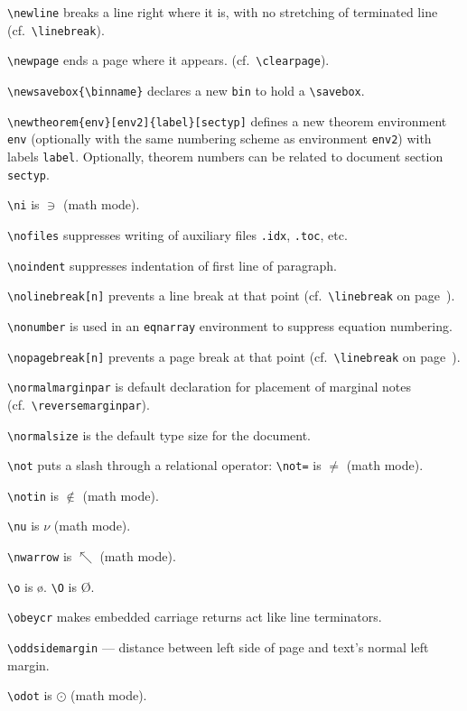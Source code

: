 \verb"\newline" breaks a line right where it is, with no stretching of
	terminated line (cf.\ \verb"\linebreak").

\verb"\newpage" ends a page where it appears. (cf.\ \verb"\clearpage").

\verb"\newsavebox{\binname}" declares a new \verb"bin" to hold a
	\verb"\savebox".

\verb"\newtheorem{env}[env2]{label}[sectyp]" defines a new theorem environment
	\verb"env" (optionally with the same numbering scheme as environment
	\verb"env2") with labels \verb"label".  Optionally, theorem numbers
	can be related to document section \verb"sectyp".

\verb"\ni" is $\ni$ (math mode).

\verb"\nofiles" suppresses writing of auxiliary files \verb".idx",
	\verb".toc", etc.

\verb"\noindent" suppresses indentation of first line of paragraph.

\verb"\nolinebreak[n]" prevents a line break at that point
	(cf.\ \verb"\linebreak" on page~\pageref{break-ref}).

\verb"\nonumber" is used in an \verb"eqnarray" environment to suppress
	equation numbering.

\verb"\nopagebreak[n]" prevents a page break at that point
	(cf.\ \verb"\linebreak" on page~\pageref{break-ref}).

\verb"\normalmarginpar" is default declaration for placement of marginal
	notes (cf.\ \verb"\reversemarginpar").

\verb"\normalsize" is the default type size for the document.

\verb"\not" puts a slash through a relational operator:
	\verb"\not=" is $\not=$ (math mode).

\verb"\notin" is $\notin$ (math mode).

\verb"\nu" is $\nu$ (math mode).

\verb"\nwarrow" is $\nwarrow$ (math mode).

\verb"\o" is \o.  \verb"\O" is \O.

\verb"\obeycr" makes embedded carriage returns act like line terminators.

\verb"\oddsidemargin" --- distance between left side of page and text's normal
	left margin.

\verb"\odot" is $\odot$ (math mode).

